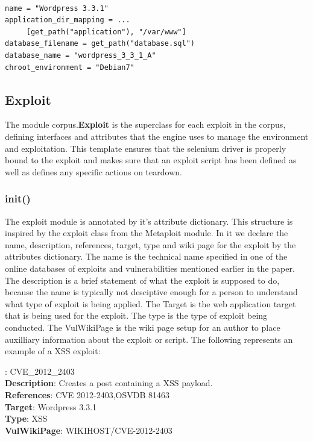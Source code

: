 \documentclass[letterpaper,twocolumn,10pt]{article}
\begin{document}
{\tt \small
\begin{verbatim}
name = "Wordpress 3.3.1"
application_dir_mapping = ...
     [get_path("application"), "/var/www"]
database_filename = get_path("database.sql")
database_name = "wordpress_3_3_1_A"
chroot_environment = "Debian7"
\end{verbatim}
} 


\subsection{Exploit}
The module corpus.{\bf Exploit} is the superclass for each exploit in the corpus, defining interfaces and attributes that the engine uses to manage the environment and exploitation.  This template ensures that the selenium driver is properly bound to the exploit and makes sure that an exploit script has been defined as well as defines any specific actions on teardown.



\subsubsection{init()}

The exploit module is annotated by it's attribute dictionary. This structure is inspired by the exploit class from the Metaploit module. In it we declare the name, description, references, target, type and wiki page for the exploit by the attributes dictionary.  The name is the technical name specified in one of the online databases of exploits and vulnerabilities mentioned earlier in the paper.  The description is a brief statement of what the exploit is supposed to do, because the name is typically not desciptive enough for a person to understand what type of exploit is being applied.  The Target is the web application target that is being used for the exploit.  The type is the type of exploit being conducted.  The VulWikiPage is the wiki page setup for an author to place auxilliary information about the exploit or script.  The following represents an example of a XSS exploit:\\

{\tt \small

:	CVE\_2012\_2403\\
{\bf Description}:		Creates a post containing a XSS payload.\\
{\bf References}:	CVE 2012-2403,OSVDB 81463 \\
{\bf Target}: 		Wordpress 3.3.1\\
{\bf Type}: 		XSS\\
{\bf VulWikiPage}: WIKIHOST/CVE-2012-2403

}
\end{document}
